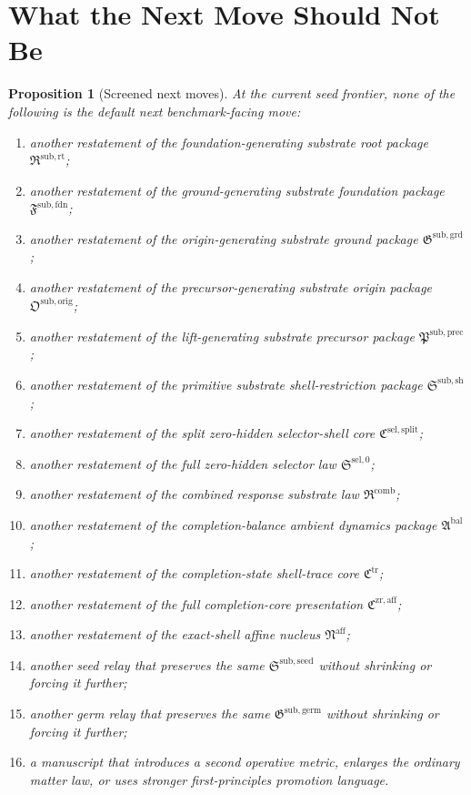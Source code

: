 \documentclass[11pt]{article}
\newcommand{\FoundationPackage}{\mathfrak F^{\mathrm{sub,fdn}}}
\newcommand{\GroundPackage}{\mathfrak G^{\mathrm{sub,grd}}}
\newcommand{\OriginPackage}{\mathfrak O^{\mathrm{sub,orig}}}
\newcommand{\PrecursorPackage}{\mathfrak P^{\mathrm{sub,prec}}}
\newcommand{\ShellRestriction}{\mathfrak S^{\mathrm{sub,sh}}}
\newcommand{\SelectorCore}{\mathfrak C^{\mathrm{sel,split}}}
\newcommand{\SelectorLaw}{\mathfrak S^{\mathrm{sel},0}}
\newcommand{\CombinedLaw}{\mathfrak R^{\mathrm{comb}}}
\newcommand{\AmbientPackage}{\mathfrak A^{\mathrm{bal}}}
\newcommand{\TraceCore}{\mathfrak C^{\mathrm{tr}}}
\newcommand{\CompletionCore}{\mathfrak C^{\mathrm{zr,aff}}}
\newcommand{\AffineNucleus}{\mathfrak N^{\mathrm{aff}}}
\newcommand{\RootPackage}{\mathfrak R^{\mathrm{sub,rt}}}
\newcommand{\SeedPackage}{\mathfrak S^{\mathrm{sub,seed}}}
\newcommand{\GermPackage}{\mathfrak G^{\mathrm{sub,germ}}}
\newtheorem{proposition}{Proposition}
\begin{document}
\section{What the Next Move Should Not Be}

\begin{proposition}[Screened next moves]
At the current seed frontier, none of the following is the default next benchmark-facing move:
\begin{enumerate}
    \item another restatement of the foundation-generating substrate root package \(\RootPackage\);
    \item another restatement of the ground-generating substrate foundation package \(\FoundationPackage\);
    \item another restatement of the origin-generating substrate ground package \(\GroundPackage\);
    \item another restatement of the precursor-generating substrate origin package \(\OriginPackage\);
    \item another restatement of the lift-generating substrate precursor package \(\PrecursorPackage\);
    \item another restatement of the primitive substrate shell-restriction package \(\ShellRestriction\);
    \item another restatement of the split zero-hidden selector-shell core \(\SelectorCore\);
    \item another restatement of the full zero-hidden selector law \(\SelectorLaw\);
    \item another restatement of the combined response substrate law \(\CombinedLaw\);
    \item another restatement of the completion-balance ambient dynamics package \(\AmbientPackage\);
    \item another restatement of the completion-state shell-trace core \(\TraceCore\);
    \item another restatement of the full completion-core presentation \(\CompletionCore\);
    \item another restatement of the exact-shell affine nucleus \(\AffineNucleus\);
    \item another seed relay that preserves the same \(\SeedPackage\) without shrinking or forcing it further;
    \item another germ relay that preserves the same \(\GermPackage\) without shrinking or forcing it further;
    \item a manuscript that introduces a second operative metric, enlarges the ordinary matter law, or uses stronger first-principles promotion language.
\end{enumerate}
\end{proposition}
\end{document}
